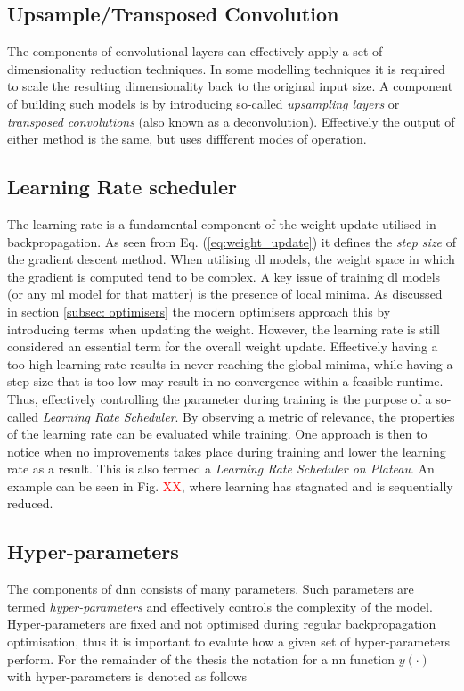\subsection{Upsample/Transposed Convolution}
The components of convolutional layers can effectively apply a set of dimensionality reduction techniques. In some modelling techniques it is required to scale the resulting dimensionality back to the original input size. A component of building such models is by introducing so-called \emph{upsampling layers} or \emph{transposed convolutions} (also known as a deconvolution). Effectively the output of either method is the same, but uses diffferent modes of operation. 


\subsection{Learning Rate scheduler}\label{subsec:lr_scheduler}
The learning rate is a fundamental component of the weight update utilised in backpropagation. As seen from Eq. (\ref{eq:weight_update}) it defines the \emph{step size} of the gradient descent method. When utilising \gls{dl} models, the weight space in which the gradient is computed tend to be complex. A key issue of training \gls{dl} models (or any \gls{ml} model for that matter) is the presence of local minima. As discussed in section \ref{subsec: optimisers} the modern optimisers approach this by introducing terms when updating the weight. However, the learning rate is still considered an essential term for the overall weight update. Effectively having a too high learning rate results in never reaching the global minima, while having a step size that is too low may result in no convergence within a feasible runtime. Thus, effectively controlling the parameter during training is the purpose of a so-called \emph{Learning Rate Scheduler}. By observing a metric of relevance, the properties of the learning rate can be evaluated while training. One approach is then to notice when no improvements takes place during training and lower the learning rate as a result. This is also termed a \emph{Learning Rate Scheduler on Plateau}. An example can be seen in Fig. \textcolor{red}{XX}, where learning has stagnated and is sequentially reduced.


\subsection{Hyper-parameters}

The components of \gls{dnn} consists of many parameters. Such parameters are termed \emph{hyper-parameters} and effectively controls the complexity of the model. Hyper-parameters are fixed and not optimised during regular backpropagation optimisation, thus it is important to evalute how a given set of hyper-parameters perform. For the remainder of the thesis the notation for a \gls{nn} function $y(\cdot)$ with hyper-parameters is denoted as follows

